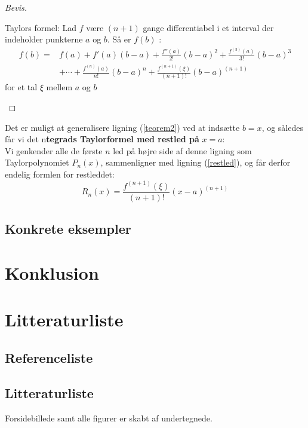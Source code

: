 \documentclass[12pt, a4paper]{article}
\begin{document}
\begin{refsection}
\begin{proof}[Bevis]
\begin{mdframed}
     Taylors formel: Lad $f$ være $(n+1)$ gange differentiabel i et interval der indeholder punkterne  $a$ og $b$. Så er $f(b)$ :
     \begin{equation}\label{teorem2}
         \begin{aligned}
            f(b)=&f(a)+f'(a)(b-a)+\frac{f''(a)}{2!}(b-a)^2+\frac{f^{(3)}(a)}{3!}(b-a)^3\\
                 &+\cdots+\frac{f^{(n)}(a)}{n!}(b-a)^n+\frac{f^{(n+1)}(\xi)}{(n+1)!}(b-a)^{(n+1)}
        \end{aligned}
        \end{equation}
        for et tal $\xi$ mellem $a$ og $b$
     \end{mdframed}
     \end{proof}
 Det er muligt at generalisere ligning (\ref{teorem2}) ved at indsætte $b=x$, og således får vi det n\textbf{tegrads Taylorformel med restled på}  $x=a$:\\
     Vi genkender alle de første $n$ led på højre side af denne ligning som Taylorpolynomiet $P_n(x)$, sammenligner med ligning (\ref{restled}), og får derfor endelig formlen for restleddet:
     \begin{equation*}
         R_n(x)=\frac{f^{(n+1)}(\xi)}{(n+1)!}(x-a)^{(n+1)}
     \end{equation*}
\subsection{Konkrete eksempler} %
\section{Konklusion} %
\newpage
\section{Litteraturliste}
\subsection{Referenceliste}
\printbibliography[title=Cited]
\end{refsection}
\subsection{Litteraturliste}
\nocite{*}
\printbibliography
Forsidebillede samt alle figurer er skabt af undertegnede.
\end{document}
